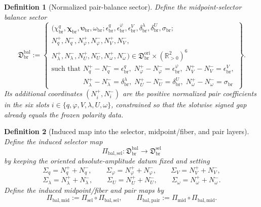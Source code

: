 \documentclass[11pt]{article}
\newcommand{\OriginSector}{\mathfrak D_{\mathrm{br}}^{\mathrm{ori}}}
\newcommand{\AbsReadAmp}{\chi_{\mathrm{br}}^{q}}
\newcommand{\AbsKinAmp}{\bm\chi_{\mathrm{br}}}
\newcommand{\AbsAnchorAmp}{\bm\upsilon_{\mathrm{br}}}
\newcommand{\AbsScaleAmp}{\omega_{\mathrm{br}}}
\newcommand{\PolRead}{\epsilon_{\mathrm{br}}^{q}}
\newcommand{\PolCov}{\epsilon_{\mathrm{br}}^{\varphi}}
\newcommand{\PolRelax}{\epsilon_{\mathrm{br}}^{V}}
\newcommand{\PolWell}{\delta_{\mathrm{br}}^{\lambda}}
\newcommand{\PolEq}{\delta_{\mathrm{br}}^{U}}
\newcommand{\PolScale}{\sigma_{\mathrm{br}}}
\newcommand{\MidPairMap}{\Pi_{\mathrm{mid}}}
\newcommand{\MidSelSector}{\mathfrak D_{\mathrm{br}}^{\mathrm{sel}}}
\newcommand{\MidSelMap}{\Pi_{\mathrm{sel}}}
\newcommand{\SelRead}{\Sigma_{q}}
\newcommand{\SelCov}{\Sigma_{\varphi}}
\newcommand{\SelRelax}{\Sigma_{V}}
\newcommand{\SelWell}{\Sigma_{\lambda}}
\newcommand{\SelEq}{\Sigma_{U}}
\newcommand{\SelScale}{\Sigma_{\omega}}
\newcommand{\MidBalanceSector}{\mathfrak D_{\mathrm{br}}^{\mathrm{bal}}}
\newcommand{\BalSelMap}{\Pi_{\mathrm{bal,sel}}}
\newcommand{\BalMidMap}{\Pi_{\mathrm{bal,mid}}}
\newcommand{\BalPairMap}{\Pi_{\mathrm{bal,pair}}}
\newcommand{\BalReadPlus}{N_{q}^{+}}
\newcommand{\BalReadMinus}{N_{q}^{-}}
\newcommand{\BalCovPlus}{N_{\varphi}^{+}}
\newcommand{\BalCovMinus}{N_{\varphi}^{-}}
\newcommand{\BalRelaxPlus}{N_{V}^{+}}
\newcommand{\BalRelaxMinus}{N_{V}^{-}}
\newcommand{\BalWellPlus}{N_{\lambda}^{+}}
\newcommand{\BalWellMinus}{N_{\lambda}^{-}}
\newcommand{\BalEqPlus}{N_{U}^{+}}
\newcommand{\BalEqMinus}{N_{U}^{-}}
\newcommand{\BalScalePlus}{N_{\omega}^{+}}
\newcommand{\BalScaleMinus}{N_{\omega}^{-}}
\newtheorem{definition}{Definition}
\begin{document}
\begin{definition}[Normalized pair-balance sector]
\label{def:balsector}
Define the midpoint-selector balance sector
\begin{equation}
\MidBalanceSector
:=
\left\{
\begin{array}{l}
(\AbsReadAmp,\AbsKinAmp,\AbsAnchorAmp,\AbsScaleAmp;\PolRead,\PolCov,\PolRelax,\PolWell,\PolEq,\PolScale;\\
\BalReadPlus,\BalReadMinus,\BalCovPlus,\BalCovMinus,\BalRelaxPlus,\BalRelaxMinus,\\
\BalWellPlus,\BalWellMinus,\BalEqPlus,\BalEqMinus,\BalScalePlus,\BalScaleMinus)
\in
\OriginSector\times(\mathbb R_{>0}^{2})^{6}
\\[0.4em]
\text{such that }
\BalReadPlus-\BalReadMinus=\PolRead,\;
\BalCovPlus-\BalCovMinus=\PolCov,\;
\BalRelaxPlus-\BalRelaxMinus=\PolRelax,\\
\phantom{\text{such that }}
\BalWellPlus-\BalWellMinus=\PolWell,\;
\BalEqPlus-\BalEqMinus=\PolEq,\;
\BalScalePlus-\BalScaleMinus=\PolScale
\end{array}
\right\}.
\label{eq:balsector}
\end{equation}
Its additional coordinates \((N_i^{+},N_i^{-})\) are the positive normalized pair coefficients in the six slots \(i\in\{q,\varphi,V,\lambda,U,\omega\}\), constrained so that the slotwise signed gap already equals the frozen polarity data.
\end{definition}

\begin{definition}[Induced map into the selector, midpoint/fiber, and pair layers]
\label{def:balmaps}
Define the induced selector map
\begin{equation}
\BalSelMap:\MidBalanceSector\longrightarrow\MidSelSector
\label{eq:balselmap}
\end{equation}
by keeping the oriented absolute-amplitude datum fixed and setting
\begin{equation}
\SelRead=\BalReadPlus+\BalReadMinus,
\qquad
\SelCov=\BalCovPlus+\BalCovMinus,
\qquad
\SelRelax=\BalRelaxPlus+\BalRelaxMinus,
\label{eq:balselA}
\end{equation}
\begin{equation}
\SelWell=\BalWellPlus+\BalWellMinus,
\qquad
\SelEq=\BalEqPlus+\BalEqMinus,
\qquad
\SelScale=\BalScalePlus+\BalScaleMinus.
\label{eq:balselB}
\end{equation}
Define the induced midpoint/fiber and pair maps by
\begin{equation}
\BalMidMap:=\MidSelMap\circ\BalSelMap,
\qquad
\BalPairMap:=\MidPairMap\circ\BalMidMap.
\label{eq:balcomposite}
\end{equation}
\end{definition}
\end{document}
